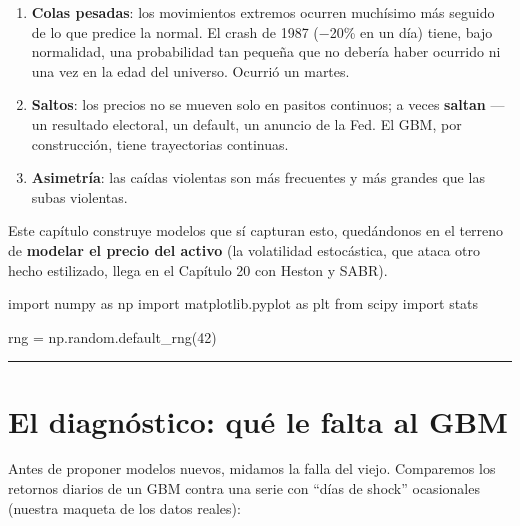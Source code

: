 \documentclass[
  spanish,
  letterpaper,
  DIV=11,
  numbers=noendperiod]{scrreprt}
\newenvironment{Shaded}{\begin{snugshade}}{\end{snugshade}}
\newcommand{\DecValTok}[1]{\textcolor[rgb]{0.68,0.00,0.00}{#1}}
\newcommand{\ImportTok}[1]{\textcolor[rgb]{0.00,0.46,0.62}{#1}}
\newcommand{\NormalTok}[1]{\textcolor[rgb]{0.00,0.23,0.31}{#1}}
\newcommand{\OperatorTok}[1]{\textcolor[rgb]{0.37,0.37,0.37}{#1}}
\providecommand{\tightlist}{%
  \setlength{\itemsep}{0pt}\setlength{\parskip}{0pt}}
\begin{document}
\begin{enumerate}
\def\labelenumi{\arabic{enumi}.}
\tightlist
\item
  \textbf{Colas pesadas}: los movimientos extremos ocurren muchísimo más
  seguido de lo que predice la normal. El crash de 1987 (−20\% en un
  día) tiene, bajo normalidad, una probabilidad tan pequeña que no
  debería haber ocurrido ni una vez en la edad del universo. Ocurrió un
  martes.
\item
  \textbf{Saltos}: los precios no se mueven solo en pasitos continuos; a
  veces \textbf{saltan} --- un resultado electoral, un default, un
  anuncio de la Fed. El GBM, por construcción, tiene trayectorias
  continuas.
\item
  \textbf{Asimetría}: las caídas violentas son más frecuentes y más
  grandes que las subas violentas.
\end{enumerate}

Este capítulo construye modelos que sí capturan esto, quedándonos en el
terreno de \textbf{modelar el precio del activo} (la volatilidad
estocástica, que ataca otro hecho estilizado, llega en el Capítulo 20
con Heston y SABR).

\label{setup}
\begin{Shaded}
\begin{Highlighting}[]
\ImportTok{import}\NormalTok{ numpy }\ImportTok{as}\NormalTok{ np}
\ImportTok{import}\NormalTok{ matplotlib.pyplot }\ImportTok{as}\NormalTok{ plt}
\ImportTok{from}\NormalTok{ scipy }\ImportTok{import}\NormalTok{ stats}

\NormalTok{rng }\OperatorTok{=}\NormalTok{ np.random.default\_rng(}\DecValTok{42}\NormalTok{)}
\end{Highlighting}
\end{Shaded}

\begin{center}\rule{0.5\linewidth}{0.5pt}\end{center}

\chapter{El diagnóstico: qué le falta al
GBM}\label{el-diagnuxf3stico-quuxe9-le-falta-al-gbm}

Antes de proponer modelos nuevos, midamos la falla del viejo. Comparemos
los retornos diarios de un GBM contra una serie con ``días de shock''
ocasionales (nuestra maqueta de los datos reales):
\end{document}
